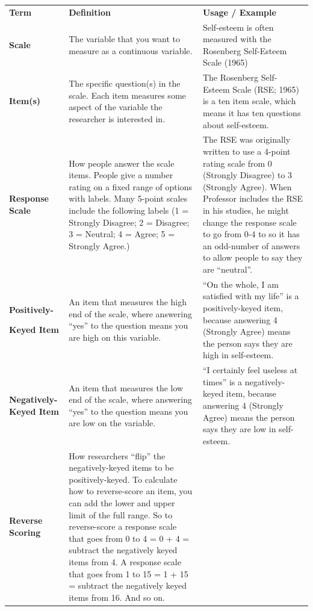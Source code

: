 \documentclass[
  letterpaper,
  DIV=11,
  numbers=noendperiod,
  oneside]{scrreprt}
\begin{document}
\begin{longtable}[]{@{}
  >{\raggedright\arraybackslash}p{}
  >{\raggedright\arraybackslash}p{}
  >{\raggedright\arraybackslash}p{}@{}}
\toprule\noalign{}
\endhead
\bottomrule\noalign{}
\endlastfoot
\textbf{Term} & \textbf{Definition} & \textbf{Usage / Example} \\
\textbf{Scale} & The variable that you want to measure as a continuous
variable. & Self-esteem is often measured with the Rosenberg Self-Esteem
Scale (1965) \\
\textbf{Item(s)} & The specific question(s) in the scale. Each item
measures some aspect of the variable the researcher is interested in. &
The Rosenberg Self-Esteem Scale (RSE; 1965) is a ten item scale, which
means it has ten questions about self-esteem. \\
\textbf{Response Scale} & How people answer the scale items. People give
a number rating on a fixed range of options with labels. Many 5-point
scales include the following labels (1 = Strongly Disagree; 2 =
Disagree; 3 = Neutral; 4 = Agree; 5 = Strongly Agree.) & The RSE was
originally written to use a 4-point rating scale from 0 (Strongly
Disagree) to 3 (Strongly Agree). When Professor includes the RSE in his
studies, he might change the response scale to go from 0-4 to so it has
an odd-number of answers to allow people to say they are ``neutral''. \\
\textbf{Positively-}

\textbf{Keyed Item} & An item that measures the high end of the scale,
where answering ``yes'' to the question means you are high on this
variable. & ``On the whole, I am satisfied with my life'' is a
positively-keyed item, because answering 4 (Strongly Agree) means the
person says they are high in self-esteem. \\
\textbf{Negatively-Keyed Item} & An item that measures the low end of
the scale, where answering ``yes'' to the question means you are low on
the variable. & ``I certainly feel useless at times'' is a
negatively-keyed item, because answering 4 (Strongly Agree) means the
person says they are low in self-esteem. \\
\textbf{Reverse Scoring} & How researchers ``flip'' the negatively-keyed
items to be positively-keyed. To calculate how to reverse-score an item,
you can add the lower and upper limit of the full range. So to
reverse-score a response scale that goes from 0 to 4 = 0 + 4 = subtract
the negatively keyed items from 4. A response scale that goes from 1 to
15 = 1 + 15 = subtract the negatively keyed items from 16. And so on.


\end{longtable}
\end{document}
